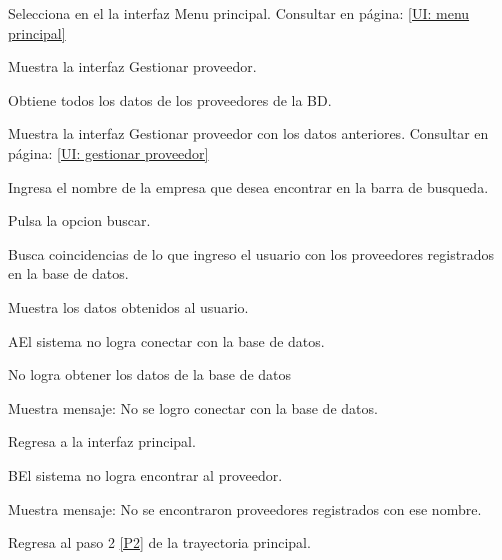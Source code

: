 \begin{UCtrayectoria}
	
	\UCpaso [\UCactor]	Selecciona  en el la interfaz Menu principal. Consultar en página: \ref{UI: menu principal} 	

	\UCpaso [\UCsist]		Muestra la interfaz Gestionar proveedor.  \label{P2}

	\UCpaso [\UCsist]		Obtiene todos los datos de los proveedores de la BD.  

	\UCpaso [\UCsist]		Muestra la interfaz Gestionar proveedor con los datos anteriores. Consultar en página: \ref{UI: gestionar proveedor} 

	\UCpaso[\UCactor] 		Ingresa el nombre de la empresa que desea encontrar en la barra de busqueda.
	
	\UCpaso[\UCactor]		Pulsa la opcion buscar.
	
	\UCpaso[\UCsist]		Busca coincidencias de lo que ingreso el usuario con los proveedores registrados en la base de datos. 

	\UCpaso[\UCsist]		Muestra los datos obtenidos al usuario. 
	
\end{UCtrayectoria}


\begin{UCtrayectoriaA}{A}{El sistema no logra conectar con la base de datos.}
	
	\UCpaso[\UCsist] No logra obtener los datos de la base de datos
	
	\UCpaso[\UCsist] Muestra mensaje: No se logro conectar con la base de datos.
			
	\UCpaso[] Regresa a la interfaz principal.
	
\end{UCtrayectoriaA}

\begin{UCtrayectoriaA}{B}{El sistema no logra encontrar al proveedor.}
	
	\UCpaso[\UCsist] Muestra mensaje: No se encontraron proveedores registrados con ese nombre.
			
	\UCpaso[] Regresa al paso 2 \ref{P2} de la trayectoria principal.
	
\end{UCtrayectoriaA}

